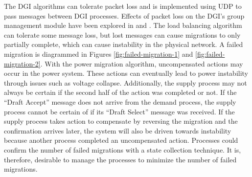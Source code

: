 The \ac{DGI} algorithms can tolerate packet loss and is implemented using UDP to pass messages between \ac{DGI} processes.
Effects of packet loss on the \ac{DGI}'s group management module have been explored in \cite{CRITIS2012} and \cite{JOURNAL}.
The load balancing algorithm can tolerate some message loss, but lost messages can cause migrations to only partially complete, which can cause instability in the physical network.
A failed migration is diagrammed in Figures \ref{fig:failed-migration-1} and \ref{fig:failed-migration-2}.
With the power migration algorithm, uncompensated actions may occur in the power system.
These actions can eventually lead to power instability through issues such as voltage collapse.
Additionally, the supply process may not always be certain if the second half of the action was completed or not.
If the ``Draft Accept'' message does not arrive from the demand process, the supply process cannot be certain of if its ``Draft Select'' message was received.
If the supply process takes action to compensate by reversing the migration and the confirmation arrives later, the system will also be driven towards instability because another process completed an uncompensated action.
Processes could confirm the number of failed migrations with a state collection technique.
It is, therefore, desirable to manage the processes to minimize the number of failed migrations.


